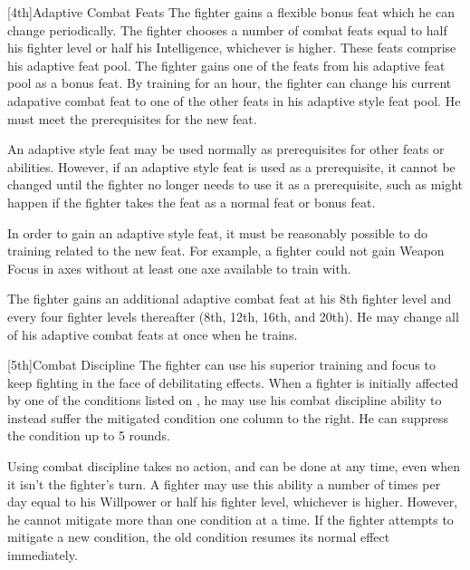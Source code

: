 [4th]{Adaptive Combat Feats}
The fighter gains a flexible bonus feat which he can change periodically.
The fighter chooses a number of combat feats equal to half his fighter level or half his Intelligence, whichever is higher.
These feats comprise his adaptive feat pool.
The fighter gains one of the feats from his adaptive feat pool as a bonus feat.
By training for an hour, the fighter can change his current adapative combat feat to one of the other feats in his adaptive style feat pool.
He must meet the prerequisites for the new feat.

\par An adaptive style feat may be used normally as prerequisites for other feats or abilities.
However, if an adaptive style feat is used as a prerequisite, it cannot be changed until the fighter no longer needs to use it as a prerequisite, such as might happen if the fighter takes the feat as a normal feat or bonus feat.

\par In order to gain an adaptive style feat, it must be reasonably possible to do training related to the new feat.
For example, a fighter could not gain Weapon Focus in axes without at least one axe available to train with.

The fighter gains an additional adaptive combat feat at his 8th fighter level and every four fighter levels thereafter (8th, 12th, 16th, and 20th).
He may change all of his adaptive combat feats at once when he trains.

[5th]{Combat Discipline}
The fighter can use his superior training and focus to keep fighting in the face of debilitating effects.
When a fighter is initially affected by one of the conditions listed on , he may use his combat discipline ability to instead suffer the mitigated condition one column to the right.
He can suppress the condition up to 5 rounds.

\par Using combat discipline takes no action, and can be done at any time, even when it isn't the fighter's turn.
A fighter may use this ability a number of times per day equal to his Willpower or half his fighter level, whichever is higher.
However, he cannot mitigate more than one condition at a time.
If the fighter attempts to mitigate a new condition, the old condition resumes its normal effect immediately.

